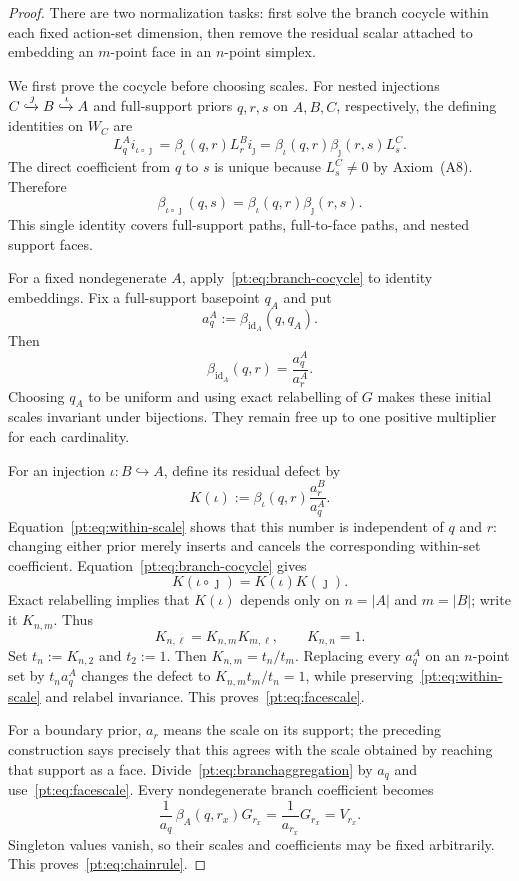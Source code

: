 \begin{proof}
There are two normalization tasks: first solve the branch cocycle within each
fixed action-set dimension, then remove the residual scalar attached to
embedding an $m$-point face in an $n$-point simplex.

We first prove the cocycle before choosing scales.  For nested injections
$C\xhookrightarrow{\jmath}B\xhookrightarrow{\iota}A$ and full-support
priors $q,r,s$ on $A,B,C$, respectively, the defining identities on $W_C$
are
\[
 L_q^A i_{\iota\circ\jmath}
 =\beta_\iota(q,r)L_r^B i_\jmath
 =\beta_\iota(q,r)\beta_\jmath(r,s)L_s^C.
\]
The direct coefficient from $q$ to $s$ is unique because $L_s^C\ne0$ by
Axiom~\textup{(A8)}.  Therefore
\begin{equation}
 \beta_{\iota\circ\jmath}(q,s)
 =\beta_\iota(q,r)\beta_\jmath(r,s).
\label{pt:eq:branch-cocycle}
\end{equation}
This single identity covers full-support paths, full-to-face paths, and
nested support faces.

For a fixed nondegenerate $A$, apply~\eqref{pt:eq:branch-cocycle} to identity
embeddings.  Fix a full-support basepoint $q_A$ and put
\[
 a_q^A:=\beta_{\mathrm{id}_A}(q,q_A).
\]
Then
\[
 \beta_{\mathrm{id}_A}(q,r)=\frac{a_q^A}{a_r^A}.
\tag{WS}\label{pt:eq:within-scale}
\]
Choosing $q_A$ to be uniform and using exact relabelling of $G$ makes these
initial scales invariant under bijections.  They remain free up to one
positive multiplier for each cardinality.

For an injection $\iota:B\hookrightarrow A$, define its residual defect by
\[
 K(\iota):=\beta_\iota(q,r)\frac{a_r^B}{a_q^A}.
\]
Equation~\eqref{pt:eq:within-scale} shows that this number is independent of
$q$ and $r$: changing either prior merely inserts and cancels the
corresponding within-set coefficient.  Equation~\eqref{pt:eq:branch-cocycle}
gives
\[
 K(\iota\circ\jmath)=K(\iota)K(\jmath).
\]
Exact relabelling implies that $K(\iota)$ depends only on
$n=|A|$ and $m=|B|$; write it $K_{n,m}$.  Thus
\[
 K_{n,\ell}=K_{n,m}K_{m,\ell},\qquad K_{n,n}=1.
\]
Set $t_n:=K_{n,2}$ and $t_2:=1$.  Then
$K_{n,m}=t_n/t_m$.  Replacing every $a_q^A$ on an $n$-point set by
$t_n a_q^A$ changes the defect to
$K_{n,m}t_m/t_n=1$, while preserving~\eqref{pt:eq:within-scale} and
relabel invariance.  This proves~\eqref{pt:eq:facescale}.

For a boundary prior, $a_r$ means the scale on its support; the preceding
construction says precisely that this agrees with the scale obtained by
reaching that support as a face.  Divide~\eqref{pt:eq:branchaggregation} by
$a_q$ and use~\eqref{pt:eq:facescale}.  Every nondegenerate branch coefficient
becomes
\[
 \frac1{a_q}\,\beta_A(q,r_x)G_{r_x}
 =\frac1{a_{r_x}}G_{r_x}=V_{r_x}.
\]
Singleton values vanish, so their scales and coefficients may be fixed
arbitrarily.  This proves~\eqref{pt:eq:chainrule}.
\end{proof}

